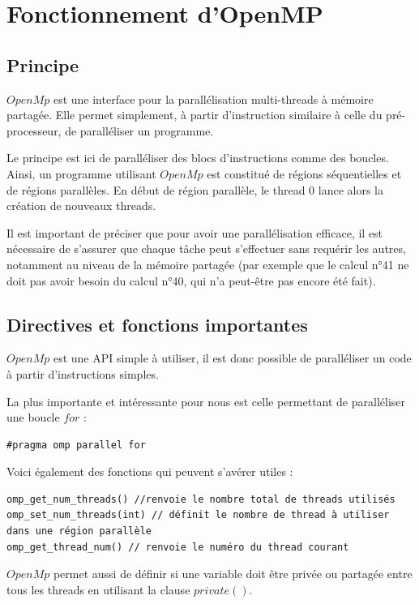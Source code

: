 \section{Fonctionnement d'OpenMP}
\subsection{Principe}
$\textit{OpenMp}$ est une interface pour la parallélisation multi-threads à mémoire partagée. Elle permet simplement, à partir d'instruction similaire à celle du pré-processeur, de paralléliser un programme.

Le principe est ici de paralléliser des blocs d'instructions comme des boucles. Ainsi, un programme utilisant $\textit{OpenMp}$ est constitué de régions séquentielles et de régions parallèles. En début de région parallèle, le thread 0 lance alors la création de nouveaux threads.

Il est important de préciser que pour avoir une parallélisation efficace, il est nécessaire de s'assurer que chaque tâche peut s'effectuer sans requérir les autres, notamment au niveau de la mémoire partagée (par exemple que le calcul n°41 ne doit pas avoir besoin du calcul n°40, qui n'a peut-être pas encore été fait).

\newpage
\subsection{Directives et fonctions importantes}
$\textit{OpenMp}$ est une API simple à utiliser, il est donc possible de paralléliser un code à partir d'instructions simples.

\vspace{2mm}
La plus importante et intéressante pour nous est celle permettant de paralléliser une boucle $\textit{for}$ :

\begin{lstlisting}
#pragma omp parallel for
\end{lstlisting}

Voici également des fonctions qui peuvent s'avérer utiles :

\begin{lstlisting}
omp_get_num_threads() //renvoie le nombre total de threads utilisés
omp_set_num_threads(int) // définit le nombre de thread à utiliser dans une région parallèle
omp_get_thread_num() // renvoie le numéro du thread courant
\end{lstlisting}

$\textit{OpenMp}$ permet aussi de définir si une variable doit être privée ou partagée entre tous les threads en utilisant la clause $private()$.

